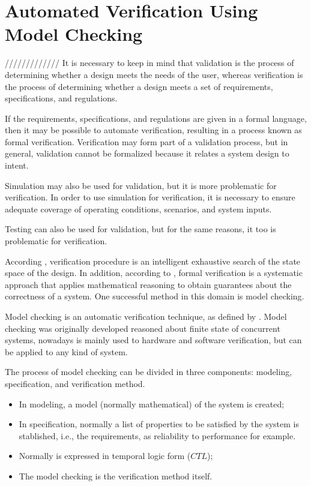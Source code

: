 \section{Automated Verification Using Model Checking}
\label{sec:AutomatedVerification}
/////////////
It is necessary to keep in mind that validation is the process of determining whether a design meets the needs of the user, whereas verification is the process of determining whether a design meets a set of requirements, specifications, and regulations.  

If the requirements, specifications, and regulations are given in a formal language, then it may be possible to automate verification, resulting in a process known as formal verification. Verification may form part of a validation process, but in general, validation cannot be formalized because it relates a system design to intent.  

Simulation may also be used for validation, but it is more problematic for verification. In order to use simulation for verification, it is necessary to ensure adequate coverage of operating conditions, scenarios, and system inputs. 

Testing can also be used for validation, but for the same reasons, it too is problematic for verification.
 
According \cite{Clarke2008}, verification procedure is an intelligent exhaustive search of the state space of the design. In addition, according to \cite{Forejt2011}, formal verification is a systematic approach that applies mathematical reasoning to obtain guarantees about the correctness of a system. One successful method in this domain is model checking.
  
Model checking is an automatic verification technique, as defined by \cite{Clarke2008}. Model checking was originally developed reasoned about finite state of concurrent systems, nowadays is mainly used to hardware and software verification, but can be applied to any kind of system. 

The process of model checking can be divided in three components: modeling, specification, and verification method. 

\begin{itemize}
\item In modeling, a model (normally mathematical) of the system is created; 
\item In specification, normally a list of properties to be satisfied by the system is stablished, i.e., the requirements, as reliability to performance for example. \item Normally is expressed in temporal logic form ($CTL$); 
\item The model checking is the verification method itself. 
\end{itemize}

